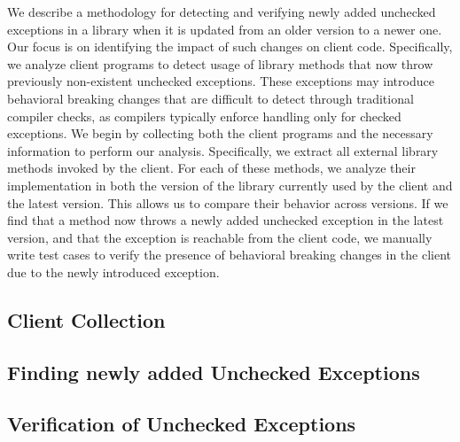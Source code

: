 We describe a methodology for detecting and verifying newly added unchecked exceptions in a library when it is updated from an older version to a newer one. Our focus is on identifying the impact of such changes on client code. Specifically, we analyze client programs to detect usage of library methods that now throw previously non-existent unchecked exceptions. These exceptions may introduce behavioral breaking changes that are difficult to detect through traditional compiler checks, as compilers typically enforce handling only for checked exceptions.
We begin by collecting both the client programs and the necessary information to perform our analysis. Specifically, we extract all external library methods invoked by the client. For each of these methods, we analyze their implementation in both the version of the library currently used by the client and the latest version. This allows us to compare their behavior across versions. If we find that a method now throws a newly added unchecked exception in the latest version, and that the exception is reachable from the client code, we manually write test cases to verify the presence of behavioral breaking changes in the client due to the newly introduced exception.
\subsection{Client Collection}
\subsection{Finding newly added Unchecked Exceptions}
\subsection{Verification of Unchecked Exceptions}
